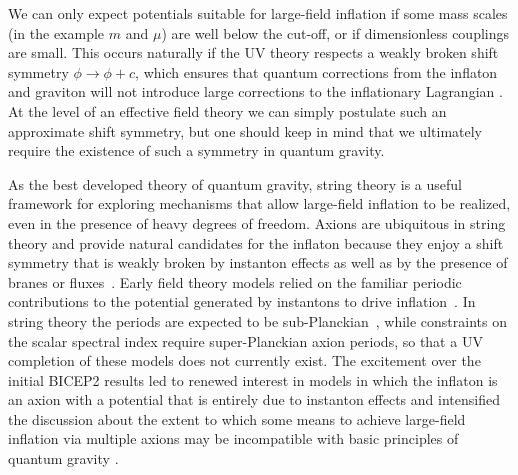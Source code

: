 We can only expect potentials suitable for large-field inflation if some mass scales (in the example $m$ and $\mu$) are well below the cut-off, or if dimensionless couplings are small. This occurs naturally if the UV theory respects a weakly broken shift symmetry $\phi\rightarrow\phi+c$, which ensures that quantum corrections from the inflaton and graviton will not introduce large corrections to the inflationary Lagrangian \cite{Linde:2005ht, Kaloper:2011jz, Csaki:2014bua,Kaplan:2015fuy,Choi:2015fiu}. At the level of an effective field theory we can simply postulate such an approximate shift symmetry, but one should keep in mind that we ultimately require the existence of such a symmetry in quantum gravity. 

As the best developed theory of quantum gravity, string theory is a useful framework for exploring mechanisms that allow large-field inflation to be realized, even in the presence of heavy degrees of freedom. Axions are ubiquitous in string theory and provide natural candidates for the inflaton because they enjoy a shift symmetry that is weakly broken by instanton effects as well as by the presence of branes or fluxes~\cite{Wen:1985jz}. Early field theory models relied on the familiar periodic contributions to the potential generated by instantons to drive inflation~\cite{Freese:1990rb,Adams:1992bn}. In string theory the periods are expected to be sub-Planckian~\cite{Banks:2003sx,ArkaniHamed:2006dz}, while constraints on the scalar spectral index require super-Planckian axion periods, so that a UV completion of these models does not currently exist. The excitement over the initial BICEP2 results \cite{Ade:2014xna} led to renewed interest in models in which the inflaton is an axion with a potential that is entirely due to instanton effects and intensified the discussion about the extent to which some means to achieve large-field inflation via multiple axions may be incompatible with basic principles of quantum gravity \cite{Kim:2004rp,Rudelius:2014wla,delaFuente:2014aca,Rudelius:2015xta,Brown:2015iha,Bachlechner:2015qja,Brown:2015lia,Heidenreich:2015wga,Heidenreich:2015nta,Kooner:2015rza}.

